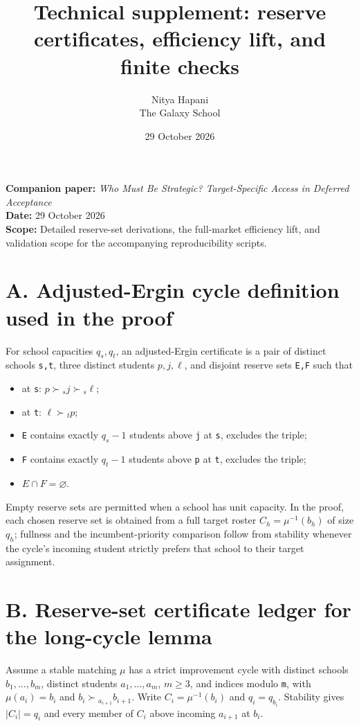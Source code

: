 \documentclass[a4paper,11pt]{article}
\title{
Technical supplement: reserve certificates, efficiency lift, and finite checks
}
\author{Nitya Hapani\\[0.25em]\small The Galaxy School}
\date{29 October 2026}
\begin{document}
\maketitle

\textbf{Companion paper:} \emph{Who Must Be Strategic? Target-Specific Access in Deferred Acceptance}\\
\textbf{Date:} 29 October 2026\\
\textbf{Scope:} Detailed reserve-set derivations, the full-market efficiency lift, and validation scope for the accompanying reproducibility scripts.


\section*{A. Adjusted-Ergin cycle definition used in the proof}
For school capacities \ensuremath{q_s,q_t}, an adjusted-Ergin certificate is a pair of distinct schools \texttt{s,t}, three distinct students \ensuremath{p,j,\ell}, and disjoint reserve sets \texttt{E,F} such that


\begin{itemize}[leftmargin=*,itemsep=0.25em,topsep=0.25em]
\item at \texttt{s}: \ensuremath{p \succ{}_s j \succ{}_s \ell};
\item at \texttt{t}: \ensuremath{\ell \succ{}_t p};
\item \texttt{E} contains exactly \ensuremath{q_s-1} students above \texttt{j} at \texttt{s}, excludes the triple;
\item \texttt{F} contains exactly \ensuremath{q_t-1} students above \texttt{p} at \texttt{t}, excludes the triple;
\item \ensuremath{E \cap{} F = \varnothing}.
\end{itemize}


Empty reserve sets are permitted when a school has unit capacity. In the proof, each chosen reserve set is obtained from a full target roster \ensuremath{C_h=\mu^{-1}(b_h)} of size \ensuremath{q_h}; fullness and the incumbent-priority comparison follow from stability whenever the cycle's incoming student strictly prefers that school to their target assignment.


\section*{B. Reserve-set certificate ledger for the long-cycle lemma}
Assume a stable matching \ensuremath{\mu} has a strict improvement cycle with distinct schools \ensuremath{b_1,...,b_m}, distinct students \ensuremath{a_1,...,a_m}, \ensuremath{m\geq{}3}, and indices modulo \texttt{m}, with \ensuremath{\mu(a_i)=b_i} and \ensuremath{b_i \succ{}_{a_{i+1}} b_{i+1}}. Write \ensuremath{C_i=\mu^{-1}(b_i)} and \ensuremath{q_i=q_{b_i}}. Stability gives \ensuremath{|C_i|=q_i} and every member of \ensuremath{C_i} above incoming \ensuremath{a_{i+1}} at \ensuremath{b_i}.
\end{document}
